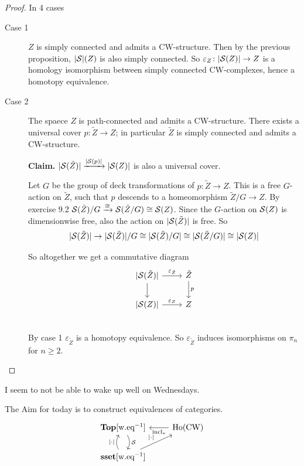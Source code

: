 \documentclass[language=english]{TemplateLecture}
\begin{document}
\begin{proof}
    In 4 cases
    \begin{description}
        \item[Case 1] \(Z\) is simply connected and admits a CW-structure. Then by the previous proposition, \(\lvert\mathcal{S}\rvert(Z)\) is also simply connected. So \(\varepsilon_Z\colon \lvert\mathcal{S}(Z)\rvert\to Z\) is a homology isomorphism between simply connected CW-complexes, hence a homotopy equivalence.
        \item[Case 2] The spaece \(Z\) is path-connected and admits a CW-structure. There exists a universal cover \(p\colon \tilde Z\to Z\); in particular \(\tilde Z\) is simply connected and admits a CW-structure.
        
        \textbf{Claim.} \(\lvert\mathcal{S}(\tilde Z)\rvert \xrightarrow{\lvert\mathcal{S}(p)\rvert} \lvert\mathcal{S}(Z)\rvert\) is also a universal cover.
        
        Let \(G\) be the group of deck transformations of \(p\colon \tilde Z\to Z\). This is a free \(G\)-action on \(\tilde Z\), such that \(p\) descends to a homeomorphism \(\tilde Z/G\to Z\). By exercise 9.2 \(\mathcal{S}(\tilde Z)/G \xrightarrow{\cong} \mathcal{S}(\tilde Z/G) \cong \mathcal{S}(Z)\). Since the \(G\)-action on \(\mathcal{S}(Z)\) is dimensionwise free, also the action on \(\lvert\mathcal{S}(\tilde Z)\rvert\) is free. So
        \[\lvert\mathcal{S}(\tilde Z)\rvert \to \lvert\mathcal{S}(\tilde Z)\rvert/G \cong \lvert\mathcal{S}(\tilde Z)/G\rvert \cong \lvert\mathcal{S}(\tilde Z/G)\rvert \cong \lvert\mathcal{S}(Z)\rvert\]

        So altogether we get a commutative diagram
        \[\begin{tikzcd}
            \abs{\cS(\tilde Z)}\ar[d]\ar[r, "\varepsilon_{\tilde Z}"] & \tilde Z \ar[d, "p"] \\
            \abs{\cS(Z)} \ar[r, "\varepsilon_Z"] & Z \\
        \end{tikzcd}\]
        By case 1 \(\varepsilon_{\tilde Z}\) is a homotopy equivalence. So \(\varepsilon_{\tilde Z}\) induces isomorphisms on \(\pi_n\) for \(n \geq 2\). 
    \end{description}
\end{proof}


I seem to not be able to wake up well on Wednesdays.


The Aim for today is to construct equivalences of categories.
\[\begin{tikzcd}
    \mathbf{Top}[\text{w.eq}^{-1}] \ar[d, bend left, "\cS"] & \mathrm{Ho}(\mathrm{CW}) \ar[l, "\incl_*"] \\
    \mathbf{sset}[\text{w.eq}^{-1}] \ar[u, bend left, "\abs\cdot"] \ar[ru, "\abs\cdot"] \\
\end{tikzcd}\]
\end{document}
